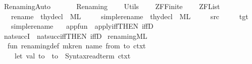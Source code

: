 %
\begin{isabellebody}%
%
%
\isadelimtheory
%
\endisadelimtheory
%
\isatagtheory
{}\isamarkupfalse%
\ Renaming{\isacharunderscore}{\kern0pt}Auto\isanewline
\ \ \isanewline
\ \ \ \ Renaming\isanewline
\ \ \ \ Utils\isanewline
\ \ \ \ ZF{\isachardot}{\kern0pt}Finite\isanewline
\ \ \ \ ZF{\isachardot}{\kern0pt}List\isanewline
\ \ \ {\isachardoublequoteopen}rename{\isachardoublequoteclose}\ {\isacharcolon}{\kern0pt}{\isacharcolon}{\kern0pt}\ thy{\isacharunderscore}{\kern0pt}decl\ {\isacharpercent}{\kern0pt}\ {\isachardoublequoteopen}ML{\isachardoublequoteclose}\isanewline
\ \ \ \ \ {\isachardoublequoteopen}simple{\isacharunderscore}{\kern0pt}rename{\isachardoublequoteclose}\ {\isacharcolon}{\kern0pt}{\isacharcolon}{\kern0pt}\ thy{\isacharunderscore}{\kern0pt}decl\ {\isacharpercent}{\kern0pt}\ {\isachardoublequoteopen}ML{\isachardoublequoteclose}\isanewline
\ \ \ \ \ {\isachardoublequoteopen}src{\isachardoublequoteclose}\isanewline
\ \ \ \ \ {\isachardoublequoteopen}tgt{\isachardoublequoteclose}\isanewline
\ \ \ {\isachardoublequoteopen}simple{\isacharunderscore}{\kern0pt}rename{\isachardoublequoteclose}\ {\isacharequal}{\kern0pt}\ {\isachardoublequoteopen}{\isachardoublequoteclose}\isanewline
{}%
\endisatagtheory
{\isafoldtheory}%
%
\isadelimtheory
\isanewline
%
\endisadelimtheory
\isanewline
{}\isamarkupfalse%
\ app{\isacharunderscore}{\kern0pt}fun\ {\isacharequal}{\kern0pt}\ apply{\isacharunderscore}{\kern0pt}iff{\isacharbrackleft}{\kern0pt}THEN\ iffD{}{\isacharbrackright}{\kern0pt}\isanewline
{}\isamarkupfalse%
\ nat{\isacharunderscore}{\kern0pt}succI\ {\isacharequal}{\kern0pt}\ nat{\isacharunderscore}{\kern0pt}succ{\isacharunderscore}{\kern0pt}iff{\isacharbrackleft}{\kern0pt}THEN\ iffD{}{\isacharbrackright}{\kern0pt}\isanewline
%
\isadelimML
\isanewline
%
\endisadelimML
%
\isatagML
{}\isamarkupfalse%
\ {\isacartoucheopen}renaming{\isachardot}{\kern0pt}ML{\isacartoucheclose}\isanewline
{}\isamarkupfalse%
{\isacartoucheopen}\isanewline
\ \ fun\ renaming{\isacharunderscore}{\kern0pt}def\ mk{\isacharunderscore}{\kern0pt}ren\ name\ from\ to\ ctxt\ {\isacharequal}{\kern0pt}\isanewline
\ \ \ \ let\ val\ to\ {\isacharequal}{\kern0pt}\ to\ {\isacharbar}{\kern0pt}{\isachargreater}{\kern0pt}\ Syntax{\isachardot}{\kern0pt}read{\isacharunderscore}{\kern0pt}term\ ctxt\isanewline

\end{isabellebody}
